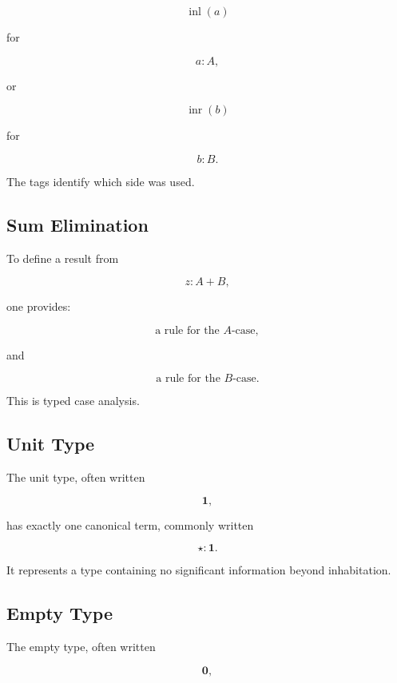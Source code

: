 \[
\boxed{
\operatorname{inl}(a)
}
\]

for

\[
a:A,
\]

or

\[
\boxed{
\operatorname{inr}(b)
}
\]

for

\[
b:B.
\]

The tags identify which side was used.

\subsection{Sum Elimination}
\label{subsec:sum-elimination}

To define a result from

\[
z:A+B,
\]

one provides:

\[
\boxed{
\text{a rule for the \(A\)-case},
}
\]

and

\[
\boxed{
\text{a rule for the \(B\)-case}.
}
\]

This is typed case analysis.

\subsection{Unit Type}
\label{subsec:unit-type}

The unit type, often written

\[
\boxed{
\mathbf{1},
}
\]

has exactly one canonical term, commonly written

\[
\boxed{
\star:\mathbf{1}.
}
\]

It represents a type containing no significant information beyond
inhabitation.

\subsection{Empty Type}
\label{subsec:empty-type}

The empty type, often written

\[
\boxed{
\mathbf{0},
}
\]

